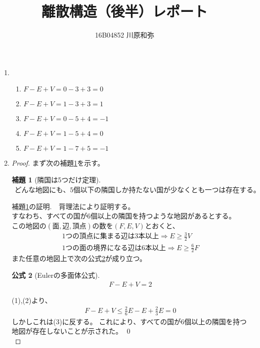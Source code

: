 \documentclass{jsarticle}
\newtheorem{lem}{補題}
\newtheorem{fom}[lem]{公式}
\begin{document}
\title{離散構造（後半）レポート}
\author{16B04852 川原和弥}
\date{}
\maketitle


\begin{enumerate}
\setlength{\itemsep}{0.4cm}

\item
\begin{enumerate}
\renewcommand{\labelenumii}{(\arabic{enumii})}
\item $ F - E + V = 0 - 3 + 3  = 0 $
\item $ F - E + V = 1 - 3 + 3  = 1 $
\item $ F - E + V = 0 - 5 + 4  = -1 $
\item $ F - E + V = 1 - 5 + 4  = 0 $
\item $ F - E + V = 1 - 7 + 5  = -1 $
\end{enumerate}


\item
\begin{proof}

まず次の補題\ref{ringoku}を示す。

\begin{lem}[隣国は5つだけ定理]
\label{ringoku}
\begin{eqnarray} どんな地図にも、5個以下の隣国しか持たない国が少なくとも一つは存在する。 \nonumber \end{eqnarray}
\end{lem}

補題\ref{ringoku}の証明.　背理法により証明する。\\
すなわち、すべての国が6個以上の隣国を持つような地図があるとする。\\
この地図の$(面,辺,頂点)$の数を$(F,E,V)$とおくと、
\begin{eqnarray}
1つの頂点に集まる辺は3本以上 \Rightarrow  E \geq \frac{3}{2} V \\
1つの面の境界になる辺は6本以上 \Rightarrow  E \geq \frac{6}{2} F
\end{eqnarray}
また任意の地図上で次の公式\ref{Euler}が成り立つ。
\begin{fom}[Eulerの多面体公式]
\label{Euler}
\begin{eqnarray} F - E + V = 2 \end{eqnarray}
\end{fom}
(1),(2)より、
\begin{eqnarray}
F - E + V \leq \frac{2}{6} E - E + \frac{2}{3} E = 0 \nonumber
\end{eqnarray}
しかしこれは(3)に反する。
これにより、すべての国が6個以上の隣国を持つ地図が存在しないことが示された。
\qed \\


\end{proof}
\end{enumerate}
\end{document}
